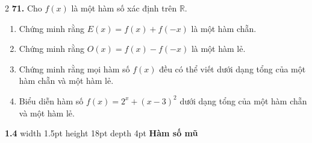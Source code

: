 \begin{multicols}{2}
\vspace{2pt}
\noindent
\textbf{71.} Cho $f(x)$ là một hàm số xác định trên $\mathbb{R}$.
\begin{enumerate}[label=(\alph*),leftmargin=*,itemsep=1pt,topsep=2pt]
    \item Chứng minh rằng $E(x) = f(x) + f(-x)$ là một hàm chẵn.
    \item Chứng minh rằng $O(x) = f(x) - f(-x)$ là một hàm lẻ.
    \item Chứng minh rằng mọi hàm số $f(x)$ đều có thể viết dưới dạng tổng của một hàm chẵn và một hàm lẻ.
    \item Biểu diễn hàm số $f(x) = 2^x + (x - 3)^2$ dưới dạng tổng của một hàm chẵn và một hàm lẻ.
\end{enumerate}

\end{multicols}

\vspace{1.5em}

\noindent
\begin{minipage}{\linewidth}
    \hspace{0.6em}
    {\fontsize{22pt}{24pt}\selectfont\textbf{\textsf{\color{stewartcyan}1.4}}}\hspace{0.5em}
    {\color{stewartcyan}\vrule width 1.5pt height 18pt depth 4pt}\hspace{0.6em}
    {\fontsize{18pt}{22pt}\selectfont\textbf{\textsf{Hàm số mũ}}}
\end{minipage}

\vspace{1.2em}

